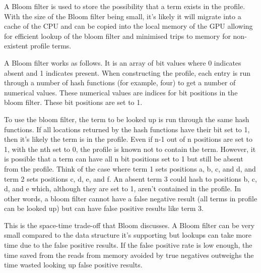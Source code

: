 A Bloom filter is used to store the possibility that a term exists in the
profile. With the size of the Bloom filter being small, it's likely it will
migrate into a cache of the CPU and can be copied into the local memory of the
GPU allowing for efficient lookup of the bloom filter and minimised trips to
memory for non-existent profile terms.

A Bloom filter works as follows. It is an array of bit values where 0 indicates
absent and 1 indicates present. When constructing the profile, each entry is
run through a number of hash functions (for example, four) to get a number of
numerical values. These numerical values are indices for bit positions in the
bloom filter. These bit positions are set to 1.

To use the bloom filter, the term to be looked up is run through the same hash
functions. If all locations returned by the hash functions have their bit set to
1, then it's likely the term is in the profile. Even if n-1 out of n positions
are set to 1, with the nth set to 0, the profile is known not to contain the
term. However, it is possible that a term can have all n bit positions set to 1
but still be absent from the profile. Think of the case where term 1 sets
positions a, b, c, and d, and term 2 sets positions c, d, e, and f. An absent
term 3 could hash to positions b, c, d, and e which, although they are set to 1,
aren't contained in the profile. In other words, a bloom filter cannot have a
false negative result (all terms in profile can be looked up) but can have false
positive results like term 3.

This is the space-time trade-off that Bloom discusses. A Bloom filter can be
very small compared to the data structure it's supporting but lookups can take
more time due to the false positive results. If the false positive rate is low
enough, the time saved from the reads from memory avoided by true negatives
outweighs the time wasted looking up false positive results.
